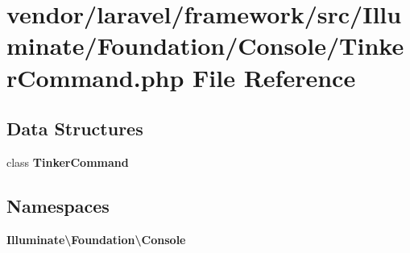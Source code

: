 \section{vendor/laravel/framework/src/\+Illuminate/\+Foundation/\+Console/\+Tinker\+Command.php File Reference}
\label{_tinker_command_8php}
\subsection*{Data Structures}
\begin{DoxyCompactItemize}
\item 
class {\bf Tinker\+Command}
\end{DoxyCompactItemize}
\subsection*{Namespaces}
\begin{DoxyCompactItemize}
\item 
 {\bf Illuminate\textbackslash{}\+Foundation\textbackslash{}\+Console}
\end{DoxyCompactItemize}
